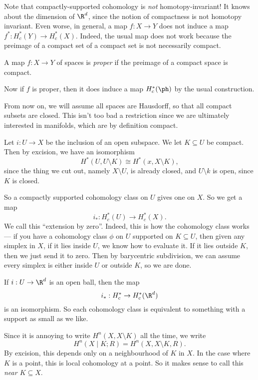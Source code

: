 \documentclass[a4paper]{article}
\begin{document}
Note that compactly-supported cohomology is \emph{not} homotopy-invariant! It knows about the dimension of $\R^d$, since the notion of compactness is not homotopy invariant. Even worse, in general, a map $f: X \to Y$ does not induce a map $f^*: H^*_c(Y) \to H^*_c(X)$. Indeed, the usual map does not work because the preimage of a compact set of a compact set is not necessarily compact.
\begin{defi}
  A map $f: X \to Y$ of spaces is \emph{proper} if the preimage of a compact space is compact.
\end{defi}
Now if $f$ is proper, then it does induce a map $H_c^* (\ph)$ by the usual construction.

From now on, we will assume all spaces are Hausdorff, so that all compact subsets are closed. This isn't too bad a restriction since we are ultimately interested in manifolds, which are by definition compact.

Let $i: U \to X$ be the inclusion of an open subspace. We let $K \subseteq U$ be compact. Then by excision, we have an isomorphism
\[
  H^*(U, U \setminus K) \cong H^*(x, X \setminus K),
\]
since the thing we cut out, namely $X \setminus U$, is already closed, and $U \setminus k$ is open, since $K$ is closed.

So a compactly supported cohomology class on $U$ gives one on $X$. So we get a map
\[
  i_*: H_c^*(U) \to H_c^*(X).
\]
We call this ``extension by zero''. Indeed, this is how the cohomology class works --- if you have a cohomology class $\phi$ on $U$ supported on $K \subseteq U$, then given any simplex in $X$, if it lies inside $U$, we know how to evaluate it. If it lies outside $K$, then we just send it to zero. Then by barycentric subdivision, we can assume every simplex is either inside $U$ or outside $K$, so we are done.

\begin{eg}
  If $i: U \to \R^d$ is an open ball, then the map
  \[
    i_*: H_c^* \to H_c^*(\R^d)
  \]
  is an isomorphism. So each cohomology class is equivalent to something with a support as small as we like.
\end{eg}

Since it is annoying to write $H^n(X, X \setminus K)$ all the time, we write
\[
  H^n(X\mid K; R) = H^n(X, X \setminus K, R).
\]
By excision, this depends only on a neighbourhood of $K$ in $X$. In the case where $K$ is a point, this is local cohomology at a point. So it makes sense to call this  \emph{near $K \subseteq X$}.
\end{document}
